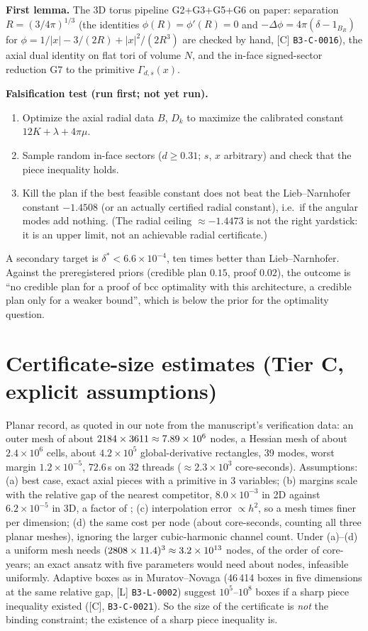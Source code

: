\documentclass[10pt]{article}
\newcommand{\tier}[1]{\textsf{[#1]}}
\newcommand{\cid}[1]{\texttt{B3-#1}}
\theoremstyle{remark}
\begin{document}
\textbf{First lemma.} The 3D torus pipeline G2+G3+G5+G6 on paper: separation $R=(3/4\pi)^{1/3}$ (the identities $\phi(R)=\phi'(R)=0$ and $-\Delta\phi=4\pi(\delta-1_{B_R})$ for $\phi=1/|x|-3/(2R)+|x|^2/(2R^3)$ are checked by hand, \tier{C} \cid{C-0016}), the axial dual identity on flat tori of volume $N$, and the in-face signed-sector reduction G7 to the primitive $\Gamma_{d,s}(x)$.

\textbf{Falsification test (run first; not yet run).}
\begin{enumerate}
\item Optimize the axial radial data $B$, $D_k$ to maximize the calibrated constant $12K+\lambda+4\pi\mu$.
\item Sample random in-face sectors ($d\ge0.31$; $s$, $x$ arbitrary) and check that the piece inequality holds.
\item Kill the plan if the best feasible constant does not beat the Lieb--Narnhofer constant $-1.4508$ (or an actually certified radial constant), i.e.\ if the angular modes add nothing. (The radial ceiling $\approx-1.4473$ is not the right yardstick: it is an upper limit, not an achievable radial certificate.)
\end{enumerate}
A secondary target is $\delta^*<6.6\times10^{-4}$, ten times better than Lieb--Narnhofer. Against the preregistered priors (credible plan $0.15$, proof $0.02$), the outcome is ``no credible plan for a proof of bcc optimality with this architecture, a credible plan only for a weaker bound'', which is below the prior for the optimality question.

\section{Certificate-size estimates (Tier C, explicit assumptions)}\label{sec:cert}
Planar record, as quoted in our note from the manuscript's verification data: an outer mesh of about $2184\times3611\approx7.89\times10^{6}$ nodes, a Hessian mesh of about $2.4\times10^6$ cells, about $4.2\times10^5$ global-derivative rectangles, 39 modes, worst margin $1.2\times10^{-5}$, $72.6$\,s on 32 threads ($\approx2.3\times10^3$ core-seconds).
Assumptions: (a) best case, exact axial pieces with a primitive in 3 variables; (b) margins scale with the relative gap of the nearest competitor, $8.0\times10^{-3}$ in 2D against $6.2\times10^{-5}$ in 3D, a factor of \BMarginRatio; (c) interpolation error $\propto h^2$, so a mesh \BRefine{} times finer per dimension; (d) the same cost per node (about \BEpsPerNode{} core-seconds, counting all three planar meshes), ignoring the larger cubic-harmonic channel count.
Under (a)--(d) a uniform mesh needs $(2808\times11.4)^3\approx3.2\times10^{13}$ nodes, of the order of \BCoreYears{} core-years; an exact ansatz with five parameters would need about \BNodesFiveD{} nodes, infeasible uniformly. Adaptive boxes as in Muratov--Novaga (46\,414 boxes in five dimensions at the same relative gap, \tier{L} \cid{L-0002}) suggest $10^5$--$10^8$ boxes if a sharp piece inequality existed (\tier{C}, \cid{C-0021}).
So the size of the certificate is \emph{not} the binding constraint; the existence of a sharp piece inequality is.
\end{document}
